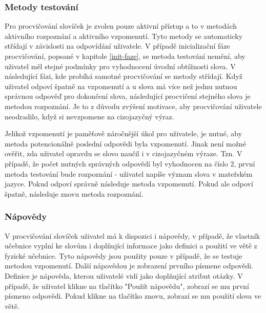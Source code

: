 \documentclass[a4paper,11pt,titlepage,fleqn]{article}
\begin{document}
        \subsubsection{Metody testování}
            Pro procvičování slovíček je zvolen pouze aktivní přístup a to v metodách aktivního rozpoznání a aktivního vzpomenutí. Tyto metody se automaticky střídají v závislosti na odpovídání uživatele. V případě inicializační fáze procvičování, popsané v kapitole \ref{init-faze}, se metoda testování nemění, aby uživatel měl stejné podmínky pro vyhodnocení úvodní obtížnosti slova. V následující fázi, kde probíhá samotné procvičování se metody střídají. Když uživatel odpoví špatně na vzpomenutí a u slova má více než jednu nutnou správnou odpověď pro dokončení slova, následující procvičení stejného slova je metodou rozpoznání. Je to z důvodu zvýšení motivace, aby procvičování uživatele neodradilo, když si nevzpomene na cizojazyčný výraz. 

            Jelikož vzpomenutí je paměťově náročnější úkol pro uživatele, je nutné, aby metoda potencionálně poslední odpovědi byla vzpomenutí. Jinak není možné ověřit, zda uživatel opravdu se slovo naučil i v cizojazyčném výraze. Tzn. V případě, že počet nutných správných odpovědí byl vyhodnocen na číslo 2, první metoda testování bude rozpoznání - uživatel napíše význam slova v mateřském jazyce. Pokud odpoví správně následuje metoda vzpomenutí. Pokud ale odpoví špatně, následuje znovu metoda rozpoznání.
    
        \subsubsection{Nápovědy}
            V procvičování slovíček uživatel má k dispozici i nápovědy, v případě, že vlastník učebnice vyplní ke slovům i doplňující informace jako definici a použití ve větě z fyzické učebnice. Tyto nápovědy jsou použity pouze v případě, že se testuje metodou vzpomenutí. Další nápovědou je zobrazení prvního písmene odpovědi. Definice je nápověda, kterou uživatelé vidí jako doplňující atribut otázky. V případě, že uživatel klikne na tlačítko "Použít nápovědu", zobrazí se mu první písmeno odpovědi. Pokud klikne na tlačítko znovu, zobrazí se mu použití slova ve větě.
\end{document}
